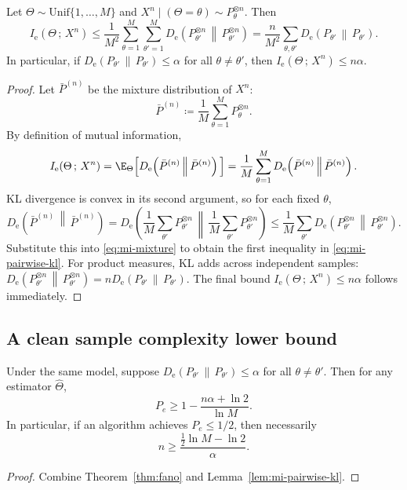\documentclass{article}
\numberwithin{equation}{section}
\newcommand{\KLnat}[2]{D_{\mathrm{e}}\!\left(#2\,\middle\|\,#2\right)}
\newcommand{\MInat}[2]{I_{\mathrm{e}}\!\left(#1\,;\,#2\right)}
\begin{document}
\begin{lemma}
\label{lem:mi-pairwise-kl}
Let $\Theta\sim\mathrm{Unif}\{1,\dots,M\}$ and $X^n\mid(\Theta=\theta)\sim P_\theta^{\otimes n}$.
Then
\begin{equation}
\label{eq:mi-pairwise-kl}
    \MInat{\Theta}{X^n}
    \le \frac{1}{M^2}\sum_{\theta=1}^M\sum_{\theta'=1}^M \KLnat{P_\theta^{\otimes n}}{P_{\theta'}^{\otimes n}}
    = \frac{n}{M^2}\sum_{\theta,\theta'} \KLnat{P_\theta}{P_{\theta'}}.
\end{equation}
In particular, if $\KLnat{P_\theta}{P_{\theta'}}\le \alpha$ for all $\theta\neq\theta'$, then $\MInat{\Theta}{X^n}\le n\alpha$.
\end{lemma}
\begin{proof}
Let $\bar P^{(n)}$ be the mixture distribution of $X^n$:
\begin{equation}
    \bar P^{(n)} \coloneqq \frac1M\sum_{\theta=1}^M P_\theta^{\otimes n}.
\end{equation}
By definition of mutual information,
\begin{equation}
\label{eq:mi-mixture}
    \MInat{\Theta}{X^n} = \E_{\Theta}\Big[\KLnat{P_\Theta^{\otimes n}}{\bar P^{(n)}}\Big]
    = \frac1M\sum_{\theta=1}^M \KLnat{P_\theta^{\otimes n}}{\bar P^{(n)}}.
\end{equation}
KL divergence is convex in its second argument, so for each fixed $\theta$,
\begin{equation}
    \KLnat{P_\theta^{\otimes n}}{\bar P^{(n)}}
    = \KLnat{P_\theta^{\otimes n}}{\frac1M\sum_{\theta'} P_{\theta'}^{\otimes n}}
    \le \frac1M\sum_{\theta'} \KLnat{P_\theta^{\otimes n}}{P_{\theta'}^{\otimes n}}.
\end{equation}
Substitute this into \eqref{eq:mi-mixture} to obtain the first inequality in \eqref{eq:mi-pairwise-kl}.
For product measures, KL adds across independent samples:
\(\KLnat{P_\theta^{\otimes n}}{P_{\theta'}^{\otimes n}} = n\KLnat{P_\theta}{P_{\theta'}}\).
The final bound $\MInat{\Theta}{X^n}\le n\alpha$ follows immediately.
\end{proof}

\subsection{A clean sample complexity lower bound}

\begin{corollary}
\label{cor:fano-sample}
Under the same model, suppose $\KLnat{P_\theta}{P_{\theta'}}\le \alpha$ for all $\theta\neq\theta'$.
Then for any estimator $\hat\Theta$,
\begin{equation}
    P_e \ge 1 - \frac{n\alpha + \ln 2}{\ln M}.
\end{equation}
In particular, if an algorithm achieves $P_e\le 1/2$, then necessarily
\begin{equation}
    n \ge \frac{\frac12\ln M - \ln 2}{\alpha}.
\end{equation}
\end{corollary}
\begin{proof}
Combine Theorem~\ref{thm:fano} and Lemma~\ref{lem:mi-pairwise-kl}.
\end{proof}
\end{document}
